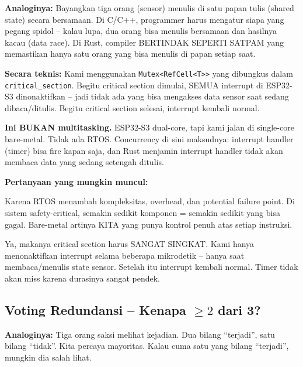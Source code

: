 \documentclass[12pt,a4paper]{article}
\begin{document}
\textbf{Analoginya:} Bayangkan tiga orang (sensor) menulis di satu papan tulis
(shared state) secara bersamaan. Di C/C++, programmer harus mengatur siapa
yang pegang spidol -- kalau lupa, dua orang bisa menulis bersamaan dan hasilnya
kacau (data race). Di Rust, compiler BERTINDAK SEPERTI SATPAM yang memastikan
hanya satu orang yang bisa menulis di papan setiap saat.

\textbf{Secara teknis:} Kami menggunakan \texttt{Mutex<RefCell<T>>} yang dibungkus dalam
\texttt{critical\_section}. Begitu critical section dimulai, SEMUA interrupt di
ESP32-S3 dinonaktifkan -- jadi tidak ada yang bisa mengakses data sensor saat
sedang dibaca/ditulis. Begitu critical section selesai, interrupt kembali normal.

\textbf{Ini BUKAN multitasking.} ESP32-S3 dual-core, tapi kami jalan di single-core
bare-metal. Tidak ada RTOS. Concurrency di sini maksudnya: interrupt handler
(timer) bisa fire kapan saja, dan Rust menjamin interrupt handler tidak akan
membaca data yang sedang setengah ditulis.

\needspace{4cm}
\textbf{Pertanyaan yang mungkin muncul:}

\begin{description}[nosep,leftmargin=2em,style=nextline]
    \item[Kenapa tidak pakai RTOS saja?]
    Karena RTOS menambah kompleksitas, overhead, dan potential failure point. Di
    sistem safety-critical, semakin sedikit komponen = semakin sedikit yang bisa gagal.
    Bare-metal artinya KITA yang punya kontrol penuh atas setiap instruksi.

    \item[Bukankah menonaktifkan interrupt itu berbahaya?]
    Ya, makanya critical section harus SANGAT SINGKAT. Kami hanya menonaktifkan
    interrupt selama beberapa mikrodetik -- hanya saat membaca/menulis state sensor.
    Setelah itu interrupt kembali normal. Timer tidak akan miss karena durasinya
    sangat pendek.
\end{description}

\subsection{Voting Redundansi -- Kenapa $\ge 2$ dari 3?}

\textbf{Analoginya:} Tiga orang saksi melihat kejadian. Dua bilang ``terjadi'', satu
bilang ``tidak''. Kita percaya mayoritas. Kalau cuma satu yang bilang ``terjadi'',
mungkin dia salah lihat.
\end{document}
